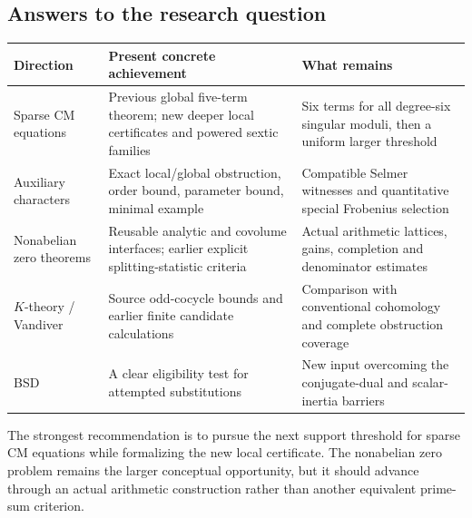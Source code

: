 \subsection{Answers to the research question}

\begin{center}
\small
\begin{tabular}{p{.24\linewidth}p{.34\linewidth}p{.32\linewidth}}
\toprule
Direction & Present concrete achievement & What remains\\
\midrule
Sparse CM equations & Previous global five-term theorem; new deeper local certificates and powered sextic families & Six terms for all degree-six singular moduli, then a uniform larger threshold\\
Auxiliary characters & Exact local/global obstruction, order bound, parameter bound, minimal example & Compatible Selmer witnesses and quantitative special Frobenius selection\\
Nonabelian zero theorems & Reusable analytic and covolume interfaces; earlier explicit splitting-statistic criteria & Actual arithmetic lattices, gains, completion and denominator estimates\\
$K$-theory / Vandiver & Source odd-cocycle bounds and earlier finite candidate calculations & Comparison with conventional cohomology and complete obstruction coverage\\
BSD & A clear eligibility test for attempted substitutions & New input overcoming the conjugate-dual and scalar-inertia barriers\\
\bottomrule
\end{tabular}
\end{center}

The strongest recommendation is to pursue the next support threshold for sparse CM equations while formalizing the new local certificate. The nonabelian zero problem remains the larger conceptual opportunity, but it should advance through an actual arithmetic construction rather than another equivalent prime-sum criterion.
